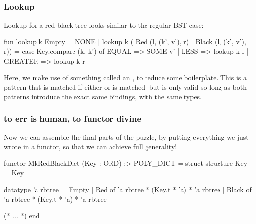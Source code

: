 \documentclass[aspectratio=169]{beamer}
\begin{document}
\begin{frame}[fragile]
  \frametitle{Lookup}

  Lookup for a red-black tree looks similar to the regular BST case:

  \pause
  \vspace{\fill}

  \begin{codeblock}
    fun lookup k Empty = NONE
      | lookup k ( Red (l, (k', v'), r)
                 | Black (l, (k', v'), r)) =
          case Key.compare (k, k') of
            EQUAL   => SOME v'
          | LESS    => lookup k l
          | GREATER => lookup k r
  \end{codeblock}

  \pause
  \vspace{\fill}

  Here, we make use of something called an , to
  reduce some boilerplate. This is a pattern 
  that is matched if either  or  is matched, but
  is only valid so long as both patterns introduce the exact same bindings,
  with the same types.
\end{frame}

\begin{frame}[fragile]
  \frametitle{to err is human, to functor divine}

  Now we can assemble the final parts of the puzzle, by putting everything
  we just wrote in a functor\footnotemark, so that we can achieve full generality!

  \pause
  \vspace{\fill}

  \begin{codeblock}
    functor MkRedBlackDict (Key : ORD) :> POLY_DICT =
      struct
        structure Key = Key

        datatype 'a rbtree =
            Empty
          | Red of 'a rbtree * (Key.t * 'a) * 'a rbtree
          | Black of 'a rbtree * (Key.t * 'a) * 'a rbtree

        (* ... *)
      end
  \end{codeblock}



\end{frame}
\end{document}
